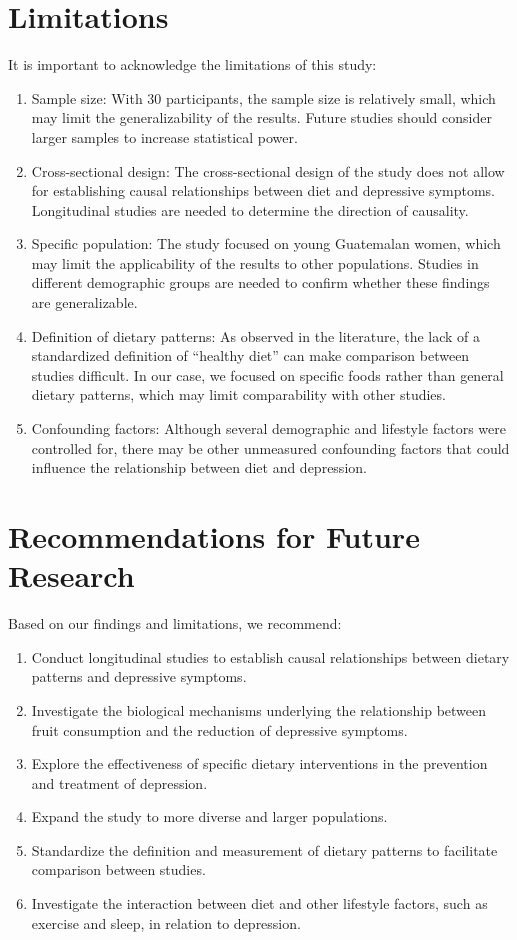 \documentclass[jou]{apa7}
\begin{document}
\section{Limitations}\label{limitaciones}

It is important to acknowledge the limitations of this study:

\begin{enumerate}
	\item Sample size: With 30 participants, the sample size is relatively small, which may limit the generalizability of the results. Future studies should consider larger samples to increase statistical power.
	\item Cross-sectional design: The cross-sectional design of the study does not allow for establishing causal relationships between diet and depressive symptoms. Longitudinal studies are needed to determine the direction of causality.
	\item Specific population: The study focused on young Guatemalan women, which may limit the applicability of the results to other populations. Studies in different demographic groups are needed to confirm whether these findings are generalizable.
	\item Definition of dietary patterns: As observed in the literature, the lack of a standardized definition of ``healthy diet'' can make comparison between studies difficult. In our case, we focused on specific foods rather than general dietary patterns, which may limit comparability with other studies.
	\item Confounding factors: Although several demographic and lifestyle factors were controlled for, there may be other unmeasured confounding factors that could influence the relationship between diet and depression.
\end{enumerate}


\section{Recommendations for Future Research}\label{recomendaciones-para-futuras-investigaciones}

Based on our findings and limitations, we recommend:
\begin{enumerate}
	\item Conduct longitudinal studies to establish causal relationships between dietary patterns and depressive symptoms.
	\item Investigate the biological mechanisms underlying the relationship between fruit consumption and the reduction of depressive symptoms.
	\item Explore the effectiveness of specific dietary interventions in the prevention and treatment of depression.
	\item Expand the study to more diverse and larger populations.
	\item Standardize the definition and measurement of dietary patterns to facilitate comparison between studies.
	\item Investigate the interaction between diet and other lifestyle factors, such as exercise and sleep, in relation to depression.
\end{enumerate}
\end{document}
